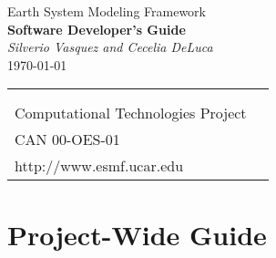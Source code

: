 \documentclass[english]{article}
\begin{document}

\begin{titlepage}

\begin{center}
{\Large    Earth System Modeling Framework } \\
{\Large {\bf  Software Developer's Guide}} \\
\medskip
{\it Silverio Vasquez and Cecelia DeLuca} \\
\vspace{.5in}
{\large \today}
\end{center}

\begin{latexonly}
\vspace{6in}
\begin{tabular}{p{5in}p{.9in}}
\hrulefill \\
\noindent {\bf NASA Earth Science Technology Office} \\
\noindent Computational Technologies Project \\
\noindent CAN 00-OES-01 \\
\noindent http://www.esmf.ucar.edu \\
\end{tabular}
\end{latexonly}

\end{titlepage}

\tableofcontents

\newpage



\setcounter{section}{0}
\newpage
\begin{htmlonly}
\end{htmlonly}
\part{Project-Wide Guide}




\setcounter{section}{0}
\newpage
\begin{htmlonly}
\end{htmlonly}
\end{document}
